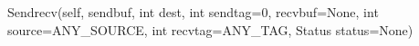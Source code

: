 Sendrecv(self,
    sendbuf, int dest, int sendtag=0,
    recvbuf=None, int source=ANY_SOURCE, int recvtag=ANY_TAG,
    Status status=None)
